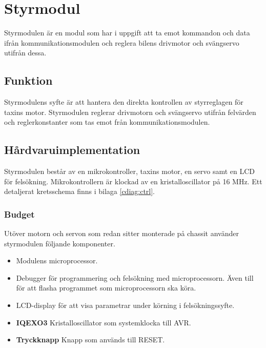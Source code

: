 \documentclass[tekniskrapport/tech.tex]{subfiles}
\begin{document}
\section{Styrmodul}
Styrmodulen är en modul som har i uppgift att ta emot kommandon och data ifrån
kommunikationsmodulen och reglera bilens drivmotor och svängservo utifrån
dessa.

\subsection{Funktion}
Styrmodulens syfte är att hantera den direkta kontrollen av styrreglagen för
taxins motor. Styrmodulen reglerar drivmotorn och svängservo utifrån
felvärden och reglerkonstanter som tas emot från kommunikationsmodulen.

\subsection{Hårdvaruimplementation}
Styrmodulen består av en mikrokontroller, taxins motor, en servo samt en LCD för
felsökning. Mikrokontrollern är klockad av en kristalloscillator på 16 MHz. Ett
detaljerat kretsschema finns i bilaga \ref{cdiag:ctrl}.

\subsubsection{Budget}
Utöver motorn och servon som redan sitter monterade på chassit använder
styrmodulen följande komponenter.
\begin{itemize}
	\item \textbf{\modMicrocontroller} Modulens microprocessor. 
    \item \textbf{\modJtag} Debugger för programmering och felsökning med
        microprocessorn. Även till för att flasha programmet som
        microprocessorn ska köra.
    \item \textbf{\modLcd} LCD-display för att visa parametrar under körning i
        felsökningssyfte.
    \item \textbf{IQEXO3} Kristalloscillator som systemklocka till AVR.
    \item \textbf{Tryckknapp} Knapp som används till RESET.
\end{itemize}
\end{document}
